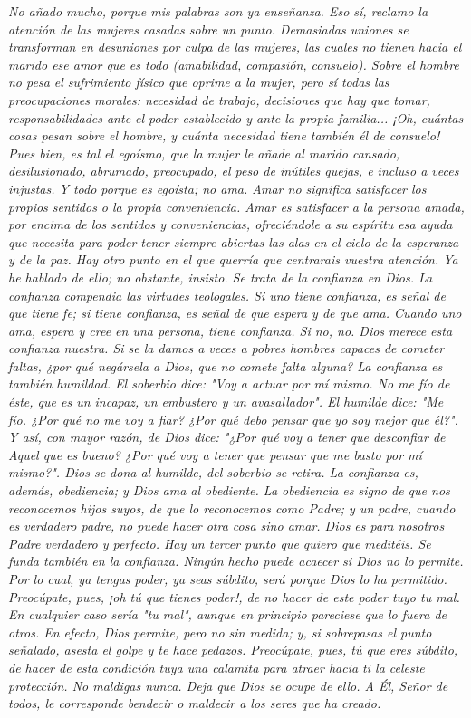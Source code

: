 \documentclass[12pt, twoside, openright]{book} %
\begin{document}
\emph{No añado mucho, porque mis palabras son ya enseñanza. Eso sí, reclamo la atención de las mujeres casadas sobre un punto. Demasiadas uniones se transforman en desuniones por culpa de las mujeres, las cuales no tienen hacia el marido ese amor que es todo (amabilidad, compasión, consuelo). Sobre el hombre no pesa el sufrimiento físico que oprime a la mujer, pero sí todas las preocupaciones morales: necesidad de trabajo, decisiones que hay que tomar, responsabilidades ante el poder establecido y ante la propia familia... ¡Oh, cuántas cosas pesan sobre el hombre, y cuánta necesidad tiene también él de consuelo! Pues bien, es tal el egoísmo, que la mujer le añade al marido cansado, desilusionado, abrumado, preocupado, el peso de inútiles quejas, e incluso a veces injustas. Y todo porque es egoísta; no ama. Amar no significa satisfacer los propios sentidos o la propia conveniencia. Amar es satisfacer a la persona amada, por encima de los sentidos y conveniencias, ofreciéndole a su espíritu esa ayuda que necesita para poder tener siempre abiertas las alas en el cielo de la esperanza y de la paz. Hay otro punto en el que querría que centrarais vuestra atención. Ya he hablado de ello; no obstante, insisto. Se trata de la confianza en Dios. La confianza compendia las virtudes teologales. Si uno tiene confianza, es señal de que tiene fe; si tiene confianza, es señal de que espera y de que ama. Cuando uno ama, espera y cree en una persona, tiene confianza. Si no, no. Dios merece esta confianza nuestra. Si se la damos a veces a pobres hombres capaces de cometer faltas, ¿por qué negársela a Dios, que no comete falta alguna? La confianza es también humildad. El soberbio dice: "Voy a actuar por mí mismo. No me fío de éste, que es un incapaz, un embustero y un avasallador". El humilde dice: "Me fío. ¿Por qué no me voy a fiar? ¿Por qué debo pensar que yo soy mejor que él?". Y así, con mayor razón, de Dios dice: "¿Por qué voy a tener que desconfiar de Aquel que es bueno? ¿Por qué voy a tener que pensar que me basto por mí mismo?". Dios se dona al humilde, del soberbio se retira. La confianza es, además, obediencia; y Dios ama al obediente. La obediencia es signo de que nos reconocemos hijos suyos, de que lo reconocemos como Padre; y un padre, cuando es verdadero padre, no puede hacer otra cosa sino amar. Dios es para nosotros Padre verdadero y perfecto. Hay un tercer punto que quiero que meditéis. Se funda también en la confianza. Ningún hecho puede acaecer si Dios no lo permite. Por lo cual, ya tengas poder, ya seas súbdito, será porque Dios lo ha permitido. Preocúpate, pues, ¡oh tú que tienes poder!, de no hacer de este poder tuyo tu mal. En cualquier caso sería "tu mal", aunque en principio pareciese que lo fuera de otros. En efecto, Dios permite, pero no sin medida; y, si sobrepasas el punto señalado, asesta el golpe y te hace pedazos. Preocúpate, pues, tú que eres súbdito, de hacer de esta condición tuya una calamita para atraer hacia ti la celeste protección. No maldigas nunca. Deja que Dios se ocupe de ello. A Él, Señor de todos, le corresponde bendecir o maldecir a los seres que ha creado. }
\end{document}
